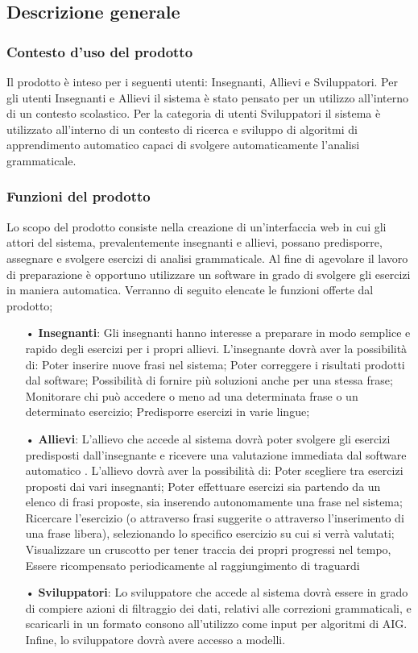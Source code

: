 \subsection{Descrizione generale}
\subsubsection{Contesto d’uso del prodotto}
Il prodotto è inteso per i seguenti utenti: Insegnanti, Allievi e Sviluppatori.
Per gli utenti Insegnanti e Allievi il sistema è stato pensato per un utilizzo all’interno di un contesto scolastico. Per la categoria di utenti Sviluppatori il sistema è utilizzato all’interno di un contesto di ricerca e sviluppo di algoritmi di apprendimento automatico capaci di svolgere automaticamente l’analisi grammaticale. 

       		
\subsubsection{Funzioni del prodotto}
Lo scopo del prodotto consiste nella creazione di un’interfaccia web in cui gli attori del sistema, prevalentemente insegnanti e allievi, possano predisporre, assegnare e svolgere esercizi di analisi grammaticale.
Al fine di agevolare il lavoro di preparazione è opportuno utilizzare un software in grado di svolgere gli esercizi in maniera automatica.
Verranno di seguito elencate le funzioni offerte dal prodotto;
\begin{itemize}
\item[•]\textbf{Insegnanti}:
Gli insegnanti hanno interesse a preparare in modo semplice e rapido degli esercizi per i propri allievi.
L’insegnante dovrà aver la possibilità di:
Poter inserire nuove frasi nel sistema;
Poter correggere i risultati prodotti dal software;
Possibilità di fornire più soluzioni anche per una stessa frase;
Monitorare chi può accedere o meno ad una determinata frase o un determinato esercizio;
Predisporre esercizi in varie lingue;

\item[•]\textbf{Allievi}:
L’allievo che accede al sistema dovrà poter svolgere gli esercizi predisposti dall’insegnante e ricevere una valutazione immediata dal software automatico .
L’allievo dovrà aver la possibilità di:
Poter scegliere tra esercizi proposti dai vari insegnanti;
Poter effettuare esercizi sia partendo da un elenco di frasi proposte, sia inserendo autonomamente una frase nel sistema;
Ricercare l’esercizio (o attraverso frasi suggerite o attraverso l’inserimento di una frase libera), selezionando lo specifico esercizio su cui si verrà valutati; 
Visualizzare un cruscotto per tener traccia dei propri progressi nel tempo,
Essere ricompensato periodicamente al raggiungimento di traguardi

\item[•]\textbf{Sviluppatori}:
Lo sviluppatore che accede al sistema dovrà essere in grado di compiere azioni di filtraggio dei dati, relativi alle correzioni grammaticali, e scaricarli in un formato consono all’utilizzo come input per algoritmi di AIG. 
Infine, lo sviluppatore dovrà avere accesso a modelli.
\end{itemize}

